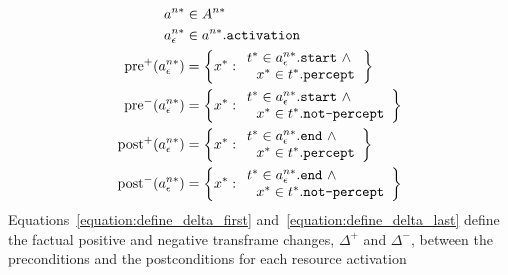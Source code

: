 \begin{align}
\label{equation:define_precondition_postcondition_first}
                                   a^{n*} &\in A^{n*} \\
                           a^{n*}_\epsilon &\in a^{n*}.\text{\tt{activation}} \\
   \text{pre}^{+}(a^{n*}_\epsilon) &= \left\{x^* : \begin{array}{l}
                                                   t^* \in a^{n*}_\epsilon.\text{\tt{start}} ~\wedge~ \\
                                                   ~~x^* \in t^*.\text{\tt{percept}}
                                                 \end{array}\right\} \\
   \text{pre}^{-}(a^{n*}_\epsilon) &= \left\{x^* : \begin{array}{l}
                                                   t^* \in a^{n*}_\epsilon.\text{\tt{start}} ~\wedge~ \\
                                                   ~~x^* \in t^*.\text{\tt{not-percept}}
                                                 \end{array}\right\} \\
  \text{post}^{+}(a^{n*}_\epsilon) &= \left\{x^* : \begin{array}{l}
                                                   t^* \in a^{n*}_\epsilon.\text{\tt{end}} ~\wedge~ \\
                                                   ~~x^* \in t^*.\text{\tt{percept}}
                                                 \end{array}\right\} \\
\label{equation:define_precondition_postcondition_last}
  \text{post}^{-}(a^{n*}_\epsilon) &= \left\{x^* : \begin{array}{l}
                                                   t^* \in a^{n*}_\epsilon.\text{\tt{end}} ~\wedge~ \\
                                                   ~~x^* \in t^*.\text{\tt{not-percept}}
                                                 \end{array}\right\} \\
\end{align}
Equations\ \ref{equation:define_delta_first}
and\ \ref{equation:define_delta_last} define the factual positive and
negative transframe changes, $\Delta^{+}$ and $\Delta^{-}$, between
the preconditions and the postconditions for each resource activation
